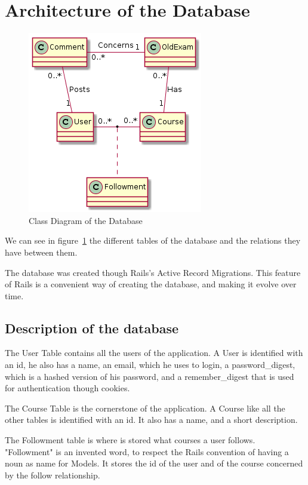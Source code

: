 \documentclass[12pt,a4paper]{article}
\begin{document}
\section{Architecture of the Database}

\begin{figure}[h]
	\centering
	\includegraphics[scale=0.7]{src/digram.png}
	\caption{\label{fig:uml} Class Diagram of the Database}
\end{figure}

We can see in figure~\ref{fig:uml} the different tables of the database and the
relations they have between them.

The database was created though Rails's Active Record Migrations. This feature of
Rails is a convenient way of creating the database, and making it evolve
over time.


\subsection{Description of the database}

The User Table contains all the users of the application. A User is identified
with an id, he also has a name, an email, which he uses to login, a
password\_digest, which is a hashed version of his password, and a
remember\_digest that is used for authentication though cookies.

The Course Table is the cornerstone of the application. A Course like all the
other tables is identified with an id. It also has a name, and a short
description.

The Followment table is where is stored what courses a user follows.
"Followment" is an invented word, to respect the Rails convention of having a
noun as name for Models. It stores the id of the user and of the course
concerned by the follow relationship.
\end{document}
